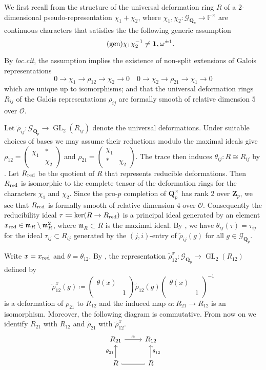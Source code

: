 \documentclass[leqno]{amsart}
\theoremstyle{definition}
\theoremstyle{remark}
\newcommand{\smat}[1]{\left(\begin{smallmatrix} #1 \end{smallmatrix}\right)}
\newcommand{\id}{\mathbf{1}}
\newcommand{\oo}{\mathcal{O}}
\newcommand{\fF}{\mathbb{F}} %
\newcommand{\Qp}{\mathbf{Q}_p}
\newcommand{\Zp}{\mathbf{Z}_p}
\DeclareMathOperator{\GL}{GL}
\newcommand{\fm}{\mathfrak{m}}
\newcommand{\Gp}{\mathcal{G}_{\Qp}} %
\newcommand{\red}{\textnormal{red}}
\newcommand{\xx}{x_\textnormal{red}}
\begin{document}
We first recall from \cite[\S B.1]{pask}
the structure of the universal deformation ring 
$R$ of a $2$-dimensional pseudo-representation 
$\chi_1+\chi_2$,
where $\chi_1,\chi_2\colon \Gp\to \fF^\times$ 
are continuous characters that satisfies the 
the following generic assumption
\begin{equation}\label{cond:generic}\tag{\text{gen}}
	\chi_1\chi_2^{-1}\neq \id,\omega^{\pm1}.
\end{equation}

By \textit{loc.cit}, the assumption
implies the existence of non-split extensions
of Galois representations
\begin{equation*}
    0\to \chi_1\to \rho_{12}\to \chi_2\to 0\quad
    0\to \chi_2\to \rho_{21}\to \chi_1\to 0
\end{equation*}
which are unique up to isomorphisms;
and that the universal deformation rings
$R_{ij}$ of the Galois representations $\rho_{ij}$
are formally smooth of relative dimension $5$ over $\oo$.


Let $\tilde{\rho}_{ij}\colon \Gp\to\GL_2(R_{ij})$
denote the universal deformations.
Under suitable choices of bases we may assume
their reductions modulo the maximal ideals give
$\rho_{12}=\smat{\chi_1&*\\&\chi_2}$ and
$\rho_{21}=\smat{\chi_1&\\ *&\chi_2}$.
The trace then induces 
$\theta_{ij}\colon R\cong R_{ij}$
by \cite[Prop B.17]{pask}.
Let $R_{\red}$ be the quotient of $R$
that represents reducible deformations.
Then $R_{\red}$ is isomorphic
to the complete tensor of the
deformation rings for the characters $\chi_1$ and $\chi_2$.
Since the pro-$p$ completion of $\Qp^\times$
has rank 2 over $\Zp$,
we see that $R_{\red}$ is formally smooth of
relative dimension $4$ over $\oo$.
Consequently the reducibility ideal 
$\tau\coloneqq \ker(R\to R_{\red})$ 
is a principal ideal generated by 
an element $\xx\in\fm_R\setminus \fm_R^2$,
where $\fm_R\subset R$ is the maximal ideal.
By \cite[Prop B.23]{pask},
we have $\theta_{ij}(\tau)=\tau_{ij}$
for the ideal $\tau_{ij}\subset R_{ij}$
generated by the $(j,i)$-entry of $ \tilde{\rho}_{ij}(g)$
for all $g\in \Gp$.

Write $x=\xx$ and $\theta=\theta_{12}$.
By \cite[Prop B.24]{pask},
the representation 
$\tilde{\rho}_{12}^x\colon \Gp\to \GL_2(R_{12})$
defined by
\begin{equation*}
	\tilde{\rho}_{12}^x(g)\coloneqq 
	\smat{\theta(x)&\\&1}
	\tilde{\rho}_{12}(g)
	\smat{\theta(x)&\\&1}^{-1}
\end{equation*}
is a deformation of $\rho_{21}$ to $R_{12}$
and the induced map
$\alpha\colon R_{21}\to R_{12}$ is an isomorphism.
Moreover, the following diagram is commutative.
From now on we identify 
$R_{21}$ with $R_{12}$ and
$\tilde{\rho}_{21}$ with 
$\tilde{\rho}_{12}^x$.
\begin{equation*}
	\begin{tikzcd}
		R_{21} \arrow[r,"\alpha"] &
		R_{12}\\
		R\arrow[u,"\theta_{21}"] \arrow[r,equal] &
		R\arrow[u,"\theta_{12}",swap]
	\end{tikzcd}
\end{equation*}
\end{document}
